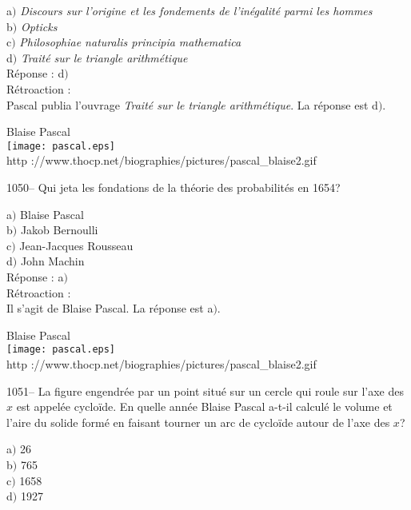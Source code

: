 ﻿\documentclass[letterpaper, 12pt]{article}
\begin{document}
a$)$ {\sl Discours sur l'origine et les fondements de l'in\'egalit\'e parmi
les hommes} \\
b$)$ {\sl Opticks}  \\
c$)$ {\sl Philosophiae naturalis principia mathematica}  \\
d$)$ {\sl Trait\'e sur le triangle arithm\'etique}\\

R\'eponse : d$)$\\

R\'etroaction : \\
Pascal publia l'ouvrage {\sl Trait\'e sur le triangle
arithm\'etique}.
La r\'eponse est d$)$.\\

        \begin{center}
        Blaise Pascal\\
    \texttt{[image: pascal.eps]}\\
        {\footnotesize http
://www.thocp.net/biographies/pictures/pascal\_blaise2.gif}
    \end{center}

1050-- Qui jeta les fondations de la th\'eorie des probabilit\'es en
1654?

a$)$ Blaise Pascal \\
b$)$ Jakob Bernoulli  \\
c$)$ Jean-Jacques Rousseau \\
d$)$ John Machin\\

R\'eponse : a$)$\\

R\'etroaction : \\
Il s'agit de Blaise Pascal.
La r\'eponse est a$)$.\\

        \begin{center}
        Blaise Pascal\\
    \texttt{[image: pascal.eps]}\\
        {\footnotesize http
://www.thocp.net/biographies/pictures/pascal\_blaise2.gif}
    \end{center}

1051-- La figure engendr\'ee par un point situ\'e sur un cercle qui
roule sur l'axe des $x$ est appel\'ee cyclo\"ide. En quelle ann\'ee
Blaise Pascal a-t-il calcul\'e le volume et l'aire du solide form\'e
en faisant tourner un arc de cyclo\"ide autour de l'axe des $x$?

a$)$ 26 \\
b$)$ 765  \\
c$)$ 1658  \\
d$)$ 1927\\
\end{document}
